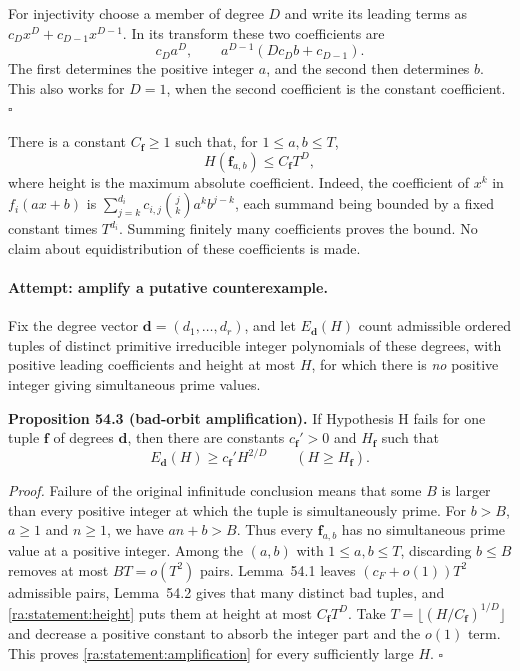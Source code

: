 \documentclass[11pt]{article}
\begin{document}
For injectivity choose a member of degree $D$ and write its leading
terms as $c_Dx^D+c_{D-1}x^{D-1}$. In its transform these two coefficients
are
\[
 c_Da^D,\qquad a^{D-1}(D c_D b+c_{D-1}).
\]
The first determines the positive integer $a$, and the second then
determines $b$. This also works for $D=1$, when the second coefficient
is the constant coefficient. \hfill$\square$

There is a constant $C_{\mathbf f}\ge1$ such that, for $1\le a,b\le T$,
\begin{equation}\label{ra:statement:height}
 H(\mathbf f_{a,b})\le C_{\mathbf f}T^D,
\end{equation}
where height is the maximum absolute coefficient. Indeed, the coefficient
of $x^k$ in $f_i(ax+b)$ is
$\sum_{j=k}^{d_i}c_{i,j}\binom jk a^k b^{j-k}$, each summand being
bounded by a fixed constant times $T^{d_i}$. Summing finitely many
coefficients proves the bound. No claim about equidistribution of these
coefficients is made.

\paragraph{Attempt: amplify a putative counterexample.}
Fix the degree vector $\mathbf d=(d_1,\ldots,d_r)$, and let
$E_{\mathbf d}(H)$ count admissible ordered tuples of distinct primitive
irreducible integer polynomials of these degrees, with positive leading
coefficients and height at most $H$, for which there is \emph{no}
positive integer giving simultaneous prime values.

\textbf{Proposition 54.3 (bad-orbit amplification).} If Hypothesis H
fails for one tuple $\mathbf f$ of degrees $\mathbf d$, then there are
constants $c_{\mathbf f}'>0$ and $H_{\mathbf f}$ such that
\begin{equation}\label{ra:statement:amplification}
 E_{\mathbf d}(H)\ge c_{\mathbf f}'H^{2/D}
 \qquad(H\ge H_{\mathbf f}).
\end{equation}

\textit{Proof.} Failure of the original infinitude conclusion means
that some $B$ is larger than every positive integer at which the tuple
is simultaneously prime. For $b>B$, $a\ge1$ and $n\ge1$, we have
$an+b>B$. Thus every $\mathbf f_{a,b}$ has no simultaneous prime value
at a positive integer. Among the $(a,b)$ with $1\le a,b\le T$, discarding
$b\le B$ removes at most $BT=o(T^2)$ pairs. Lemma~54.1 leaves
$(c_F+o(1))T^2$ admissible pairs, Lemma~54.2 gives that many distinct
bad tuples, and \eqref{ra:statement:height} puts them at height at most
$C_{\mathbf f}T^D$. Take
$T=\lfloor(H/C_{\mathbf f})^{1/D}\rfloor$ and decrease a positive
constant to absorb the integer part and the $o(1)$ term. This proves
\eqref{ra:statement:amplification} for every sufficiently large $H$.
\hfill$\square$
\end{document}
